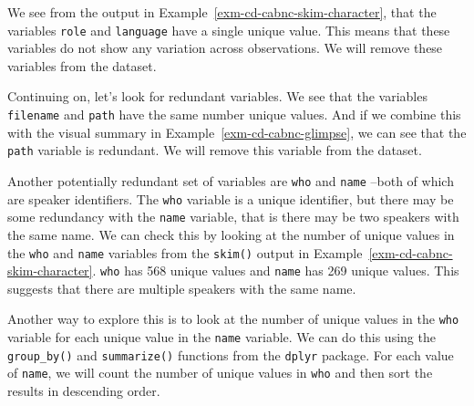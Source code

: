 \documentclass[
  letterpaper,
]{latex/krantz}
\theoremstyle{definition}
\theoremstyle{remark}
\begin{document}
We see from the output in Example~\ref{exm-cd-cabnc-skim-character},
that the variables \texttt{role} and \texttt{language} have a single
unique value. This means that these variables do not show any variation
across observations. We will remove these variables from the dataset.

Continuing on, let's look for redundant variables. We see that the
variables \texttt{filename} and \texttt{path} have the same number
unique values. And if we combine this with the visual summary in
Example~\ref{exm-cd-cabnc-glimpse}, we can see that the \texttt{path}
variable is redundant. We will remove this variable from the dataset.

Another potentially redundant set of variables are \texttt{who} and
\texttt{name} --both of which are speaker identifiers. The \texttt{who}
variable is a unique identifier, but there may be some redundancy with
the \texttt{name} variable, that is there may be two speakers with the
same name. We can check this by looking at the number of unique values
in the \texttt{who} and \texttt{name} variables from the \texttt{skim()}
output in Example~\ref{exm-cd-cabnc-skim-character}. \texttt{who} has
568 unique values and \texttt{name} has 269 unique values. This suggests
that there are multiple speakers with the same name.

Another way to explore this is to look at the number of unique values in
the \texttt{who} variable for each unique value in the \texttt{name}
variable. We can do this using the \texttt{group\_by()} and
\texttt{summarize()} functions from the \texttt{dplyr} package. For each
value of \texttt{name}, we will count the number of unique values in
\texttt{who} and then sort the results in descending order.
\end{document}
